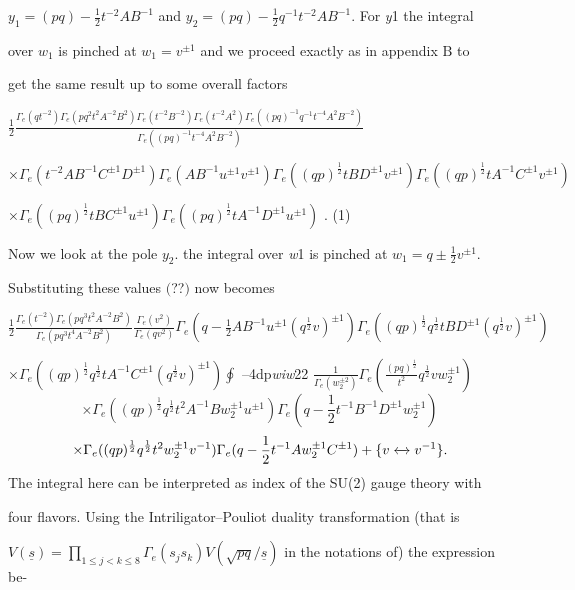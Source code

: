 \documentclass[a4paper,12pt]{article}
\begin{document}
$y_{1} = (pq)-\displaystyle \frac{1}{2}t^{-2}AB^{-1}$ and $y_{2} = (pq)-\displaystyle \frac{1}{2}q^{-1}t^{-2}AB^{-1}$. For {\it y}1 the integral

over $w_{1}$ is pinched at $w_{1}=v^{\pm 1}$ and we proceed exactly as in appendix $\mathrm{B}$ to

get the same result up to some overall factors

$\displaystyle \frac{1}{2}\frac{\Gamma_{e}(qt^{-2})\Gamma_{e}(pq^{2}t^{2}A^{-2}B^{2})\Gamma_{e}(t^{-2}B^{-2})\Gamma_{e}(t^{-2}A^{2})\Gamma_{e}((pq)^{-1}q^{-1}t^{-4}A^{2}B^{-2})}{\Gamma_{e}((pq)^{-1}t^{-4}A^{2}B^{-2})}$

$\times\Gamma_{e}(t^{-2}AB^{-1}C^{\pm 1}D^{\pm 1})\Gamma_{e}(AB^{-1}u^{\pm 1}v^{\pm 1})\Gamma_{e}((qp)^{\frac{1}{2}}tBD^{\pm 1}v^{\pm 1})\Gamma_{e}((qp)^{\frac{1}{2}}tA^{-1}C^{\pm 1}v^{\pm 1})$
\begin{center}
$\times\Gamma_{e}((pq)^{\frac{1}{2}}tBC^{\pm 1}u^{\pm 1})\Gamma_{e}((pq)^{\frac{1}{2}}tA^{-1}D^{\pm 1}u^{\pm 1})$ . (1)
\end{center}
Now we look at the pole $y_{2}$. the integral over {\it w}1 is pinched at $w_{1}=q\displaystyle \pm\frac{1}{2}v^{\pm 1}.$

Substituting these values $($??$)$ now becomes

$\displaystyle \frac{1}{2}\frac{\Gamma_{e}(t^{-2})\Gamma_{e}(pq^{3}t^{2}A^{-2}B^{2})}{\Gamma_{e}(pq^{3}t^{4}A^{-2}B^{2})}\frac{\Gamma_{e}(v^{2})}{\Gamma_{e}(qv^{2})}\Gamma_{e}(q-\frac{1}{2}AB^{-1}u^{\pm 1}(q^{\frac{1}{2}}v)^{\pm 1})\Gamma_{e}((qp)^{\frac{1}{2}}q^{\frac{1}{2}}tBD^{\pm 1}(q^{\frac{1}{2}}v)^{\pm 1})$

$\displaystyle \times\Gamma_{e}((qp)^{\frac{1}{2}}q^{\frac{1}{2}}tA^{-1}C^{\pm 1}(q^{\frac{1}{2}}v)^{\pm 1})\oint$ --4dp{\it wiw}22 $\displaystyle \frac{1}{\Gamma_{e}(w_{2}^{\pm 2})}\Gamma_{e} (\displaystyle \frac{(pq)^{\frac{1}{2}}}{t^{2}}q^{\frac{1}{2}}vw_{2}^{\pm 1})$
$$
\times\Gamma_{e}((qp)^{\frac{1}{2}}q^{\frac{1}{2}}t^{2}A^{-1}Bw_{2}^{\pm 1}u^{\pm 1})\Gamma_{e}(q-\frac{1}{2}t^{-1}B^{-1}D^{\pm 1}w_{2}^{\pm 1})
$$
$$
\times\Gamma_{e}((qp)^{\frac{1}{2}}q^{\frac{1}{2}}t^{2}w_{2}^{\pm 1}v^{-1})\Gamma_{e}(q-\frac{1}{2}t^{-1}Aw_{2}^{\pm 1}C^{\pm 1})+\{v\xleftrightarrow{}v^{-1}\}.
$$
The integral here can be interpreted as index of the SU(2) gauge theory with

four flavors. Using the Intriligator–Pouliot duality transformation (that is

$V(\underline{s}) = \displaystyle \prod_{1\leq j<k\leq 8}\Gamma_{e}(s_{j}s_{k})V(\sqrt{pq}/\underline{s})$ in the notations of) the expression be-
\end{document}
